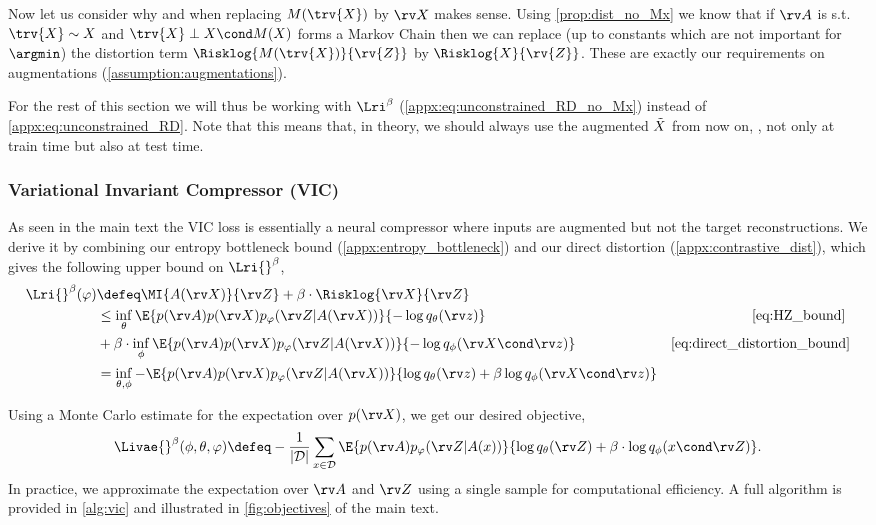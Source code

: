 \documentclass[final]{article}
\begin{document}
Now let us consider why and when replacing $M(\trv{X})$ by $\rv X$ makes sense.
Using \cref{prop:dist_no_Mx} we know that if $\rv A$ is s.t. $\trv{X} \sim X $ and $\trv{X} \perp X \cond M(X) $ forms a Markov Chain then we can replace (up to constants which are not important for $\argmin$) the distortion term
$\Risklog{M(\trv{X})}{\rv{Z}}$ by $\Risklog{X}{\rv{Z}}$. 
These are exactly our requirements on augmentations (\cref{assumption:augmentations}).

For the rest of this section we will thus be working with $\Lri^\beta$ (\cref{appx:eq:unconstrained_RD_no_Mx}) instead of \cref{appx:eq:unconstrained_RD}.
Note that this means that, in theory, we should always use the augmented $\Tilde{X}$ from now on, \ie, not only at train time but also at test time.


\subsubsection{Variational Invariant Compressor (VIC)}
\label{appx:vic}

As seen in the main text the VIC loss is essentially a neural compressor where inputs are augmented but not the target reconstructions.
We derive it by combining our entropy bottleneck bound (\cref{appx:entropy_bottleneck}) and our direct distortion (\cref{appx:contrastive_dist}), which gives the following upper bound on $\Lri{}^\beta$,
\begin{align}
\Lri{}^\beta(\varphi) 
&\defeq \MI{A(\rv X)}{\rv Z} + \beta \cdot \Risklog{\rv X}{\rv Z} \\
&\leq \inf_{\theta} \E{ p(\rv A)p(\rv X)p_{\varphi}(\rv Z | A(\rv X)) } {- \log q_{\theta}(\rv z)} & \text{\cref{eq:HZ_bound} }\\
&+ \beta \cdot \inf_{\phi} \E{p(\rv A)p(\rv X)p_{\varphi}(\rv Z |A(\rv X))} {- \log q_{\phi}(\rv X \cond \rv z)} & \text{\cref{eq:direct_distortion_bound}} \\
&=  \inf_{\theta,\phi} - \E{ p(\rv A)p(\rv X)p_{\varphi}(\rv Z | A(\rv X)) } {  \log q_{\theta}(\rv z) + \beta \log q_{\phi}(\rv X \cond \rv z)}  \label{eq:upperbound_vic}
\end{align}


Using a Monte Carlo estimate for the expectation over $p(\rv X)$, we get our desired objective,
\begin{align}
\Livae{}^\beta(\phi, \theta, \varphi)
\defeq 
-
\frac{1}{|\mathcal{D}|}\sum_{x \in \mathcal{D}}
\E{p(\rv A)p_\varphi(\rv Z|A(x))}{
\log q_\theta(\rv Z) + \beta \cdot \log q_\phi(x \cond \rv Z)}.
\end{align}
In practice, we approximate the expectation over $\rv A$ and $\rv Z$ using a single sample for computational efficiency.
A full algorithm is provided in \cref{alg:vic} and illustrated in \cref{fig:objectives} of the main text.
\end{document}
